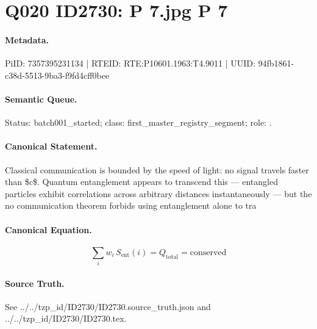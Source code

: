 \section*{Q020 ID2730: P 7.jpg P 7}
\paragraph{Metadata.}
PiID: 7357395231134 | RTEID: RTE:P10601.1963:T4.9011 | UUID: 94fb1861-c38d-5513-9ba3-f9fd4cff0bee

\paragraph{Semantic Queue.}
Status: batch001\_started; class: first\_master\_registry\_segment; role: .

\paragraph{Canonical Statement.}
Classical communication is bounded by the speed of light: no signal travels faster than \$c\$. Quantum entanglement appears to transcend this — entangled particles exhibit correlations across arbitrary distances instantaneously — but the no communication theorem forbids using entanglement alone to tra

\paragraph{Canonical Equation.}
\[
\sum_i w_i\, S_\text{ent}(i) = Q_\text{total} = \text{conserved}
\]

\paragraph{Source Truth.}
See ../../tzp\_id/ID2730/ID2730.source\_truth.json and ../../tzp\_id/ID2730/ID2730.tex.
